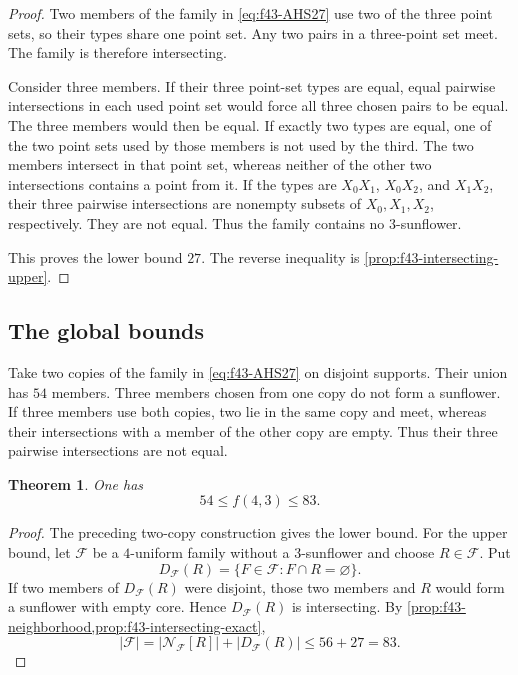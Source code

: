 \documentclass[11pt]{article}
\numberwithin{equation}{section}
\newtheorem{theorem}{Theorem}[section]
\theoremstyle{definition}
\theoremstyle{remark}
\newcommand{\F}{\mathcal F}
\begin{document}
\begin{proof}
Two members of the family in \cref{eq:f43-AHS27} use two of the three point
sets, so their types share one point set. Any two pairs in a three-point set
meet. The family is therefore intersecting.

Consider three members. If their three point-set types are equal, equal
pairwise intersections in each used point set would force all three chosen
pairs to be equal. The three members would then be equal. If exactly two
types are equal, one of the two point sets used by those members is not used
by the third. The two members intersect in that point set, whereas neither
of the other two intersections contains a point from it. If the types are
$X_0X_1$, $X_0X_2$, and $X_1X_2$, their
three pairwise intersections are nonempty subsets of $X_0,X_1,X_2$,
respectively. They are not equal. Thus the family contains no
$3$-sunflower.

This proves the lower bound $27$. The reverse inequality is
\cref{prop:f43-intersecting-upper}.
\end{proof}

\subsection{The global bounds}

Take two copies of the family in \cref{eq:f43-AHS27} on disjoint supports.
Their union has $54$ members. Three members chosen from one copy do not form
a sunflower. If three members use both copies, two lie in the same copy and
meet, whereas their intersections with a member of the other copy are empty.
Thus their three pairwise intersections are not equal.

\begin{theorem}
\label{thm:f43-bounds}
One has
\begin{equation}
 54\le f(4,3)\le83.
 \label{eq:f43-bounds}
\end{equation}
\end{theorem}

\begin{proof}
The preceding two-copy construction gives the lower bound. For the upper
bound, let $\F$ be a $4$-uniform family without a $3$-sunflower and choose
$R\in\F$. Put
\[
 D_{\F}(R)=\{F\in\F:F\cap R=\varnothing\}.
\]
If two members of $D_{\F}(R)$ were disjoint, those two members and $R$ would
form a sunflower with empty core. Hence $D_{\F}(R)$ is intersecting. By
\cref{prop:f43-neighborhood,prop:f43-intersecting-exact},
\[
 |\F|=|\mathcal N_{\F}[R]|+|D_{\F}(R)|\le56+27=83.
\]
\end{proof}
\end{document}
